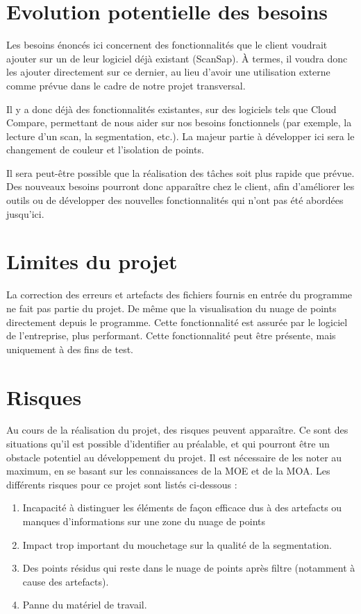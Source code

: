 \documentclass[12pt,titlepage,french]{article}
\begin{document}
\section{Evolution potentielle des besoins}

Les besoins énoncés ici concernent des fonctionnalités que le client voudrait ajouter sur un de leur logiciel déjà existant (ScanSap). À termes, il voudra donc les ajouter directement sur ce dernier, au lieu d'avoir une utilisation externe comme prévue dans le cadre de notre projet transversal.

Il y a donc déjà des fonctionnalités existantes, sur des logiciels tels que Cloud Compare, permettant de nous aider sur nos besoins fonctionnels (par exemple, la lecture d'un scan, la segmentation, etc.). La majeur partie à développer ici sera le changement de couleur et l'isolation de points.

Il sera peut-être possible que la réalisation des tâches soit plus rapide que prévue. Des nouveaux besoins pourront donc apparaître chez le client, afin d'améliorer les outils ou de développer des nouvelles fonctionnalités qui n'ont pas été abordées jusqu'ici.


\section{Limites du projet}

La correction des erreurs et artefacts des fichiers fournis en entrée du programme ne fait pas partie du projet.
De même que la visualisation du nuage de points directement depuis le programme. Cette fonctionnalité est assurée par le logiciel de l'entreprise, plus performant. Cette fonctionnalité peut être présente, mais uniquement à des fins de test.

\section{Risques}

Au cours de la réalisation du projet, des risques peuvent apparaître. Ce sont des situations qu'il est possible d'identifier au préalable, et qui pourront être un obstacle potentiel au développement du projet. Il est nécessaire de les noter au maximum, en se basant sur les connaissances de la MOE et de la MOA. Les différents risques pour ce projet sont listés ci-dessous :
\begin{enumerate}
\item Incapacité à distinguer les éléments de façon efficace dus à des artefacts ou manques d'informations sur une zone du nuage de points
\item Impact trop important du mouchetage sur la qualité de la segmentation.
\item Des points résidus qui reste dans le nuage de points après filtre (notamment à cause des artefacts).
\item Panne du matériel de travail.
\end{enumerate}
\end{document}
